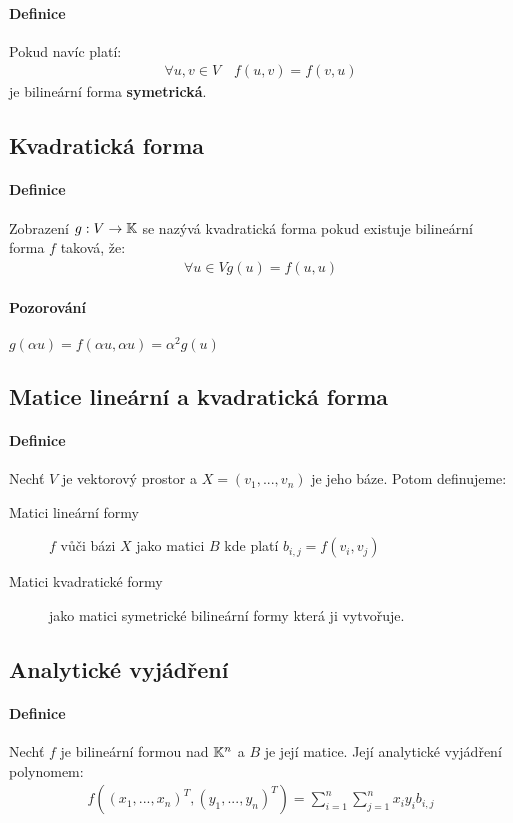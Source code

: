 \documentclass[a4paper,10pt]{article}
\begin{document}
\paragraph{Definice}
Pokud navíc platí:
\begin{align*}
	\forall u,v \in V \quad f(u,v) = f(v, u)
\end{align*}
je bilineární forma \textbf{symetrická}.

\subsection{Kvadratická forma}
\setcounter{equation}{0}
\paragraph{Definice}
Zobrazení $g: V \to \mathbb{K}$ se nazývá kvadratická forma pokud existuje bilineární
forma $f$ taková, že:
\begin{align*}
	\forall u \in V g(u) = f(u, u)
\end{align*}
\paragraph{Pozorování}
$g(\alpha u) = f(\alpha u, \alpha u) = \alpha^2 g(u)$


\subsection{Matice lineární a kvadratická forma}
\setcounter{equation}{0}
\paragraph{Definice}
Nechť $V$ je vektorový prostor a $X=(v_1, ..., v_n)$ je jeho báze. Potom definujeme:
\begin{description}
	\item[Matici lineární formy] $f$ vůči bázi $X$ jako matici $B$ kde platí $b_{i,j}
	= f(v_i, v_j)$
	\item[Matici kvadratické formy] jako matici symetrické bilineární formy
	která ji vytvořuje.
\end{description}

\subsection{Analytické vyjádření}
\setcounter{equation}{0}
\paragraph{Definice}
Nechť $f$ je bilineární formou nad $\mathbb{K}^n$ a $B$ je její matice. Její analytické vyjádření polynomem:
\begin{align*}
	f((x_1, ..., x_n)^T, (y_1, ..., y_n)^T) = \sum_{i=1}^n \sum_{j=1}^n x_i y_i
	b_{i,j}
\end{align*}
\end{document}
